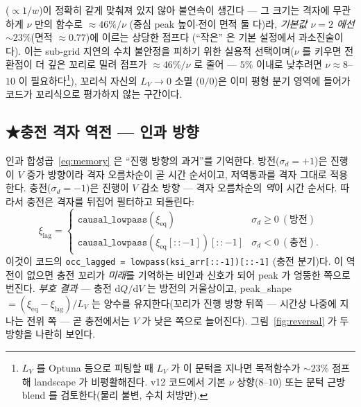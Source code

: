 \documentclass[11pt,a4paper]{article}
\newcommand{\dd}{\mathrm{d}}
\newcommand{\eq}{\mathrm{eq}}
\newcommand{\code}[1]{\texttt{#1}}
\begin{document}
($\propto 1/w$)이 정확히 같게 맞춰져 있지 않아 불연속이 생긴다 — 그 크기는 격자에 무관하게 $\nu$ 만의 함수로 $\approx46\%/\nu$
(중심 peak 높이$\cdot$전이 면적 둘 다)라, \emph{기본값 $\nu=2$ 에선 $\sim23\%$}(면적 $\approx0.77$)에 이르는 상당한 점프다
(``작은'' 은 기본 설정에서 과소진술이다). 이는 sub-grid 지연의 수치 불안정을 피하기 위한 실용적 선택이며($\nu$ 를 키우면
전환점이 더 깊은 꼬리로 밀려 점프가 $\approx46\%/\nu$ 로 줄어 — $5\%$ 이내로 낮추려면 $\nu\!\approx\!8$--$10$ 이
필요하다\footnote{$L_V$ 를 Optuna 등으로 피팅할 때 $L_V$ 가 이 문턱을 지나면 목적함수가 $\sim23\%$ 점프해 landscape 가
비평활해진다. v12 코드에서 기본 $\nu$ 상향($8$--$10$) 또는 문턱 근방 blend 를 검토한다(물리 불변, 수치 처방만).}), 꼬리식 자신의 $L_V\to0$ 소멸
($0/0$)은 이미 평형 분기 영역에 들어가 코드가 꼬리식으로 평가하지 않는 구간이다.

\subsection{★충전 격자 역전 — 인과 방향}
인과 합성곱~\eqref{eq:memory} 은 ``진행 방향의 과거''를 기억한다. 방전($\sigma_d=+1$)은 진행이 $V$ 증가 방향이라 격자
오름차순이 곧 시간 순서이고, 저역통과를 격자 그대로 적용한다. 충전($\sigma_d=-1$)은 진행이 $V$ 감소 방향 — 격자
오름차순의 \emph{역}이 시간 순서다. 따라서 충전은 격자를 뒤집어 필터하고 되돌린다:
\begin{equation}
\xi_\mathrm{lag}=
\begin{cases}
\code{causal\_lowpass}(\xi_\eq) & \sigma_d\ge0\ (\text{방전})\\[2pt]
\code{causal\_lowpass}(\xi_\eq[::-1])[::-1] & \sigma_d<0\ (\text{충전}).
\end{cases}
\label{eq:reversal}
\end{equation}
이것이 코드의 \code{occ\_lagged = lowpass(ksi\_arr[::-1])[::-1]} (충전 분기)다. 이 역전이 없으면 충전 꼬리가
\emph{미래}를 기억하는 비인과 신호가 되어 peak 가 엉뚱한 쪽으로 번진다. \emph{부호 결과} — 충전 $\dd Q/\dd V$ 는 방전의
거울상이고, peak\_shape $=(\xi_\eq-\xi_\mathrm{lag})/L_V$ 는 양수를 유지한다(꼬리가 진행 방향 뒤쪽 —
시간상 나중에 지나는 전위 쪽 — 곧 충전에서는 $V$ 가 낮은 쪽으로 늘어진다). 그림~\ref{fig:reversal} 가 두 방향을 나란히 보인다.
\end{document}
